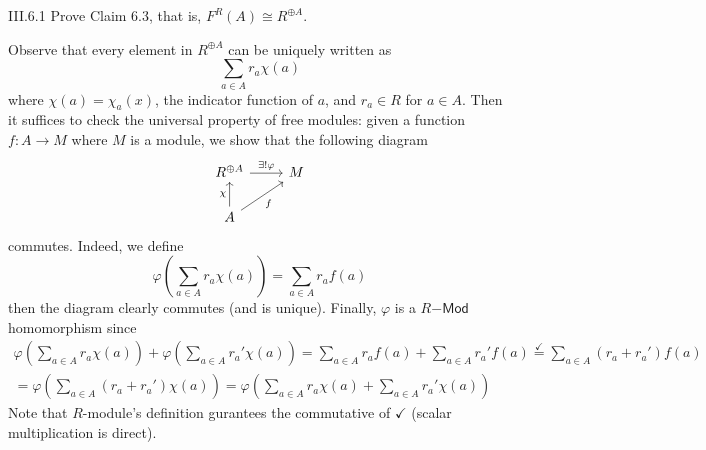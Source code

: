 \begin{problem}{III.6.1}
Prove Claim 6.3, that is, $F^R(A) \cong R^{\oplus A}$.
\end{problem}
\begin{pf}
Observe that every element in $R^{\oplus A}$ can be uniquely written as
\[
\sum_{a \in A}r_a \chi(a)	
\]
where $\chi(a) = \chi_a(x)$, the indicator function of $a$, and $r_a \in R$ for $a \in A$. Then it suffices to check the universal property of free modules: given a function $f : A \to M$ where $M$ is a module, we show that the following diagram 
\[
\begin{tikzcd}
R^{\oplus A} \arrow[r, "\exists!\varphi"] & M \\
A \arrow[u, "\chi"] \arrow[ru, "f"']      &  
\end{tikzcd}
\]
commutes. Indeed, we define
\[
\varphi\left(\sum_{a \in A}r_a \chi(a)\right) = \sum_{a \in A}r_a f(a)
\]
then the diagram clearly commutes (and is unique). Finally, $\varphi$ is a $R\mathsf{-Mod}$ homomorphism since 
\begin{align*}
\varphi\left(\sum_{a \in A}r_a \chi(a)\right) + \varphi\left(\sum_{a \in A}r_a' \chi(a)\right) = \sum_{a \in A}r_a f(a) + \sum_{a \in A}r_a' f(a)\overset{\checkmark}{=} \sum_{a \in A}(r_a+r_a') f(a) \\
= \varphi\left(\sum_{a \in A}(r_a+r_a') \chi(a)\right) = \varphi\left(\sum_{a \in A}r_a \chi(a) + \sum_{a \in A}r_a' \chi(a)\right)	
\end{align*}
Note that $R$-module's definition gurantees the commutative of $\checkmark$ (scalar multiplication is direct).
\end{pf}

